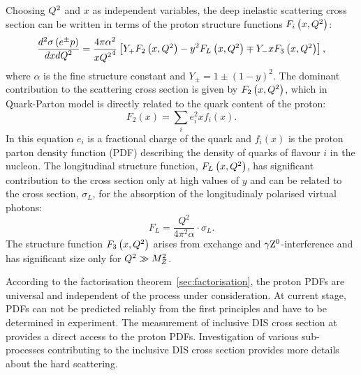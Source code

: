 Choosing $\mbox{${Q^2}$}$ and $x$ as independent variables, the deep inelastic scattering cross section can be written in terms of the proton structure functions $F_i\left(x,\mbox{${Q^2}$}\right)$:
\begin{equation}
\frac{d^2\sigma\left( e^\pm p \right) }{dxd\mbox{${Q^2}$}} = \frac{4\pi\alpha^2}{x\mbox{${Q^2}$}^4}\left[ Y_+F_2\left(x,\mbox{${Q^2}$}\right) - y^2F_L\left(x,\mbox{${Q^2}$}\right) \mp Y_-xF_3\left(x,\mbox{${Q^2}$}\right) \right],
\label{eq:ddifDIS}
\end{equation}
where $\alpha$ is the fine structure constant and $Y_\pm = 1 \pm \left( 1 - y \right)^2$. The dominant contribution to the scattering cross section is given by $F_2\left(x,\mbox{${Q^2}$}\right)$, which in Quark-Parton model is directly related to the quark content of the proton:
\begin{equation}
F_2\left(x\right) = \sum_i{e_i^2xf_i\left(x\right)}.
\label{eq:f2pdf}
\end{equation}
In this equation $e_i$ is a fractional charge of the quark and $f_i\left(x\right)$ is the proton parton density function (PDF) describing the density of quarks of flavour $i$ in the nucleon. The longitudinal structure function, $F_L\left(x,\mbox{${Q^2}$}\right)$, has significant contribution to the cross section only at high values of $y$ and can be related to the cross section, $\sigma_L$, for the absorption of the longitudinaly polarised virtual photons:
\begin{equation}
F_L = \frac{Q^2}{4\pi^2\alpha}\cdot \sigma_L.
\label{eq:sigmal}
\end{equation}
The structure function $F_3\left(x,\mbox{${Q^2}$}\right)$ arises from \zn exchange and $\gamma\mbox{$\rm{Z}^0$}$-interference and has significant size only for $\mbox{${Q^2}$} \gg M^2_Z$.

According to the factorisation theorem~\ref{sec:factorisation}, the proton PDFs are universal and independent of the process under consideration. At current stage, PDFs can not be predicted reliably from the first principles and have to be determined in experiment. The measurement of inclusive DIS cross section at \hera provides a direct access to the proton PDFs. Investigation of various sub-processes contributing to the inclusive DIS cross section provides more details about the hard scattering.

